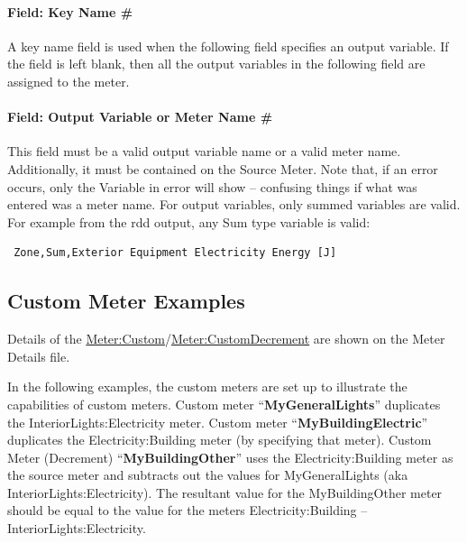 \paragraph{Field: Key Name \#}\label{field-key-name-1}

A key name field is used when the following field specifies an output variable. If the field is left blank, then all the output variables in the following field are assigned to the meter.

\paragraph{Field: Output Variable or Meter Name \#}\label{field-output-variable-or-meter-name-1}

This field must be a valid output variable name or a valid meter name. Additionally, it must be contained on the Source Meter. Note that, if an error occurs, only the Variable in error will show -- confusing things if what was entered was a meter name. For output variables, only summed variables are valid. For example from the rdd output, any Sum type variable is valid:
\begin{lstlisting}
 Zone,Sum,Exterior Equipment Electricity Energy [J]
\end{lstlisting}

\subsection{Custom Meter Examples}\label{custom-meter-examples}

Details of the \hyperref[metercustom]{Meter:Custom}/\hyperref[metercustomdecrement]{Meter:CustomDecrement} are shown on the Meter Details file.

In the following examples, the custom meters are set up to illustrate the capabilities of custom meters. Custom meter ``\textbf{MyGeneralLights}'' duplicates the InteriorLights:Electricity meter. Custom meter ``\textbf{MyBuildingElectric}'' duplicates the Electricity:Building meter (by specifying that meter). Custom Meter (Decrement) ``\textbf{MyBuildingOther}'' uses the Electricity:Building meter as the source meter and subtracts out the values for MyGeneralLights (aka InteriorLights:Electricity). The resultant value for the MyBuildingOther meter should be equal to the value for the meters Electricity:Building -- InteriorLights:Electricity.

